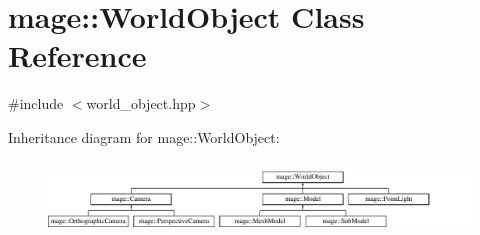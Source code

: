 \hypertarget{classmage_1_1_world_object}{}\section{mage\+:\+:World\+Object Class Reference}
\label{classmage_1_1_world_object}


{\ttfamily \#include $<$world\+\_\+object.\+hpp$>$}

Inheritance diagram for mage\+:\+:World\+Object\+:\begin{figure}[H]
\begin{center}
\leavevmode
\includegraphics[height=1.920000cm]{classmage_1_1_world_object}
\end{center}
\end{figure}
